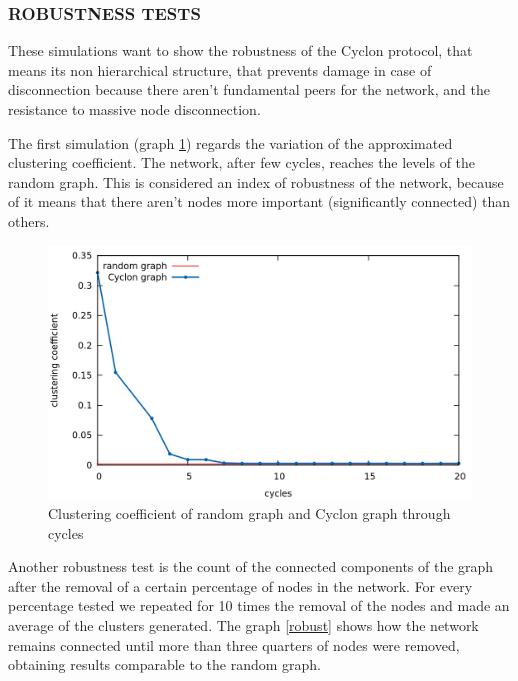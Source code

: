 \documentclass[a4paper,12pt,notitlepage]{article} %
\begin{document}
\subsubsection{ROBUSTNESS TESTS}
These simulations want to show the robustness of the Cyclon protocol, that means its non
 hierarchical structure, that prevents damage in case of disconnection because there aren't
 fundamental peers for the network, and the resistance to massive node disconnection.

The first simulation (graph \ref{clust}) regards the variation of the approximated clustering coefficient. The network,
 after few cycles, reaches the levels of the random graph. This is considered an index of robustness of the 
 network, because of it means that there aren't nodes more important (significantly connected) than others.

\begin{figure} [H]
	\centering
	\includegraphics[width=1\textwidth]{img/clustering}
	\caption{Clustering coefficient of random graph and Cyclon graph through  cycles }
	\label{clust}
\end{figure}


Another robustness test is the count of the connected components of the graph after the removal of a certain 
 percentage of nodes in the network. For every percentage tested we repeated for 10 times the removal of the
 nodes and made an average of the clusters generated. The graph \ref{robust} shows how the network remains
 connected until more than three quarters of nodes were removed, obtaining results comparable to the random
 graph.
 
\end{document}
